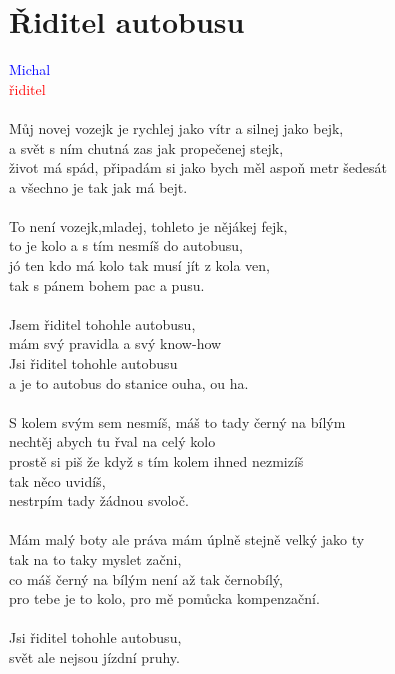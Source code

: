 \section{Řiditel autobusu}
\textcolor{blue}{Michal}\\
\textcolor{red}{řiditel}\\
\\
\color{blue}
Můj novej vozejk je rychlej jako vítr a silnej jako bejk,\\
a svět s ním chutná zas jak propečenej stejk,\\
život má spád, připadám si jako bych měl aspoň metr šedesát\\
a všechno je tak jak má bejt.\\
\\
\color{red}
To není vozejk,mladej, tohleto je nějákej fejk,\\
to je kolo a s tím nesmíš do autobusu,\\
jó ten kdo má kolo tak musí jít z kola ven,\\
tak s pánem bohem pac a pusu.\\
\\
Jsem řiditel tohohle autobusu,\\
mám svý pravidla a svý know-how \\
\color{blue}
Jsi řiditel tohohle autobusu\\
a je to autobus do stanice ouha, ou ha.\\
\\
\color{red}
S kolem svým sem nesmíš, máš to tady černý na bílým\\
nechtěj abych tu řval na celý kolo\\
prostě si piš že když s tím kolem ihned nezmizíš\\
tak něco uvidíš,\\
nestrpím tady žádnou svoloč.\\
\\
\color{blue}
Mám malý boty ale práva mám úplně stejně velký jako ty\\
tak na to taky myslet začni,\\
co máš černý na bílým není až tak černobílý,\\
pro tebe je to kolo, pro mě pomůcka kompenzační.\\
\\
Jsi řiditel tohohle autobusu,\\
svět ale nejsou jízdní pruhy.\\
